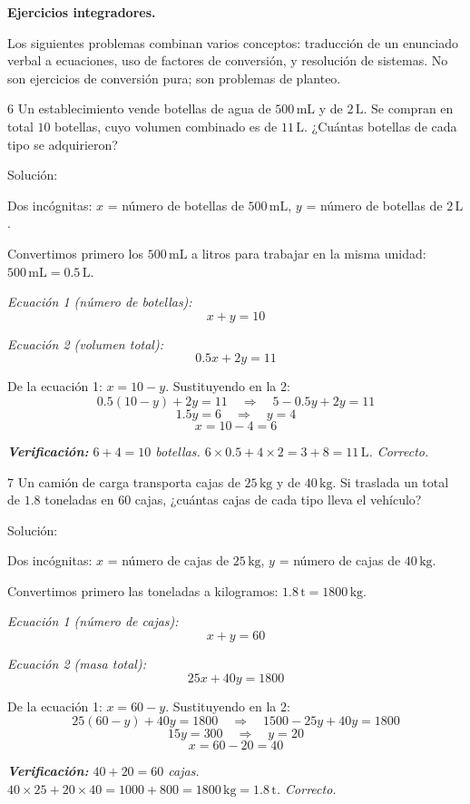 
\textbf{Ejercicios integradores.}

Los siguientes problemas combinan varios conceptos: traducción de un
enunciado verbal a ecuaciones, uso de factores de conversión, y
resolución de sistemas. No son ejercicios de conversión pura; son
problemas de planteo.

\begin{exercise}{6}{}
Un establecimiento vende botellas de agua de $500\,\mathrm{mL}$ y de
$2\,\mathrm{L}$. Se compran en total $10$ botellas, cuyo volumen
combinado es de $11\,\mathrm{L}$. ¿Cuántas botellas de cada tipo se
adquirieron?

Solución:

Dos incógnitas: $x$ = número de botellas de $500\,\mathrm{mL}$,
$y$ = número de botellas de $2\,\mathrm{L}$.

Convertimos primero los $500\,\mathrm{mL}$ a litros para trabajar en
la misma unidad: $500\,\mathrm{mL} = 0.5\,\mathrm{L}$.

\textit{Ecuación 1 (número de botellas):}
\[
x + y = 10
\]

\textit{Ecuación 2 (volumen total):}
\[
0.5x + 2y = 11
\]

De la ecuación 1: $x = 10 - y$. Sustituyendo en la 2:
\[
0.5(10 - y) + 2y = 11 \quad \Rightarrow \quad 5 - 0.5y + 2y = 11
\]
\[
1.5y = 6 \quad \Rightarrow \quad y = 4
\]
\[
x = 10 - 4 = 6
\]

{\small\itshape
\textbf{Verificación:} $6 + 4 = 10$ botellas.
$6 \times 0.5 + 4 \times 2 = 3 + 8 = 11\,\mathrm{L}$. Correcto.
}
\end{exercise}

\begin{exercise}{7}{}
Un camión de carga transporta cajas de $25\,\mathrm{kg}$ y de
$40\,\mathrm{kg}$. Si traslada un total de $1.8$ toneladas en
$60$ cajas, ¿cuántas cajas de cada tipo lleva el vehículo?

Solución:

Dos incógnitas: $x$ = número de cajas de $25\,\mathrm{kg}$,
$y$ = número de cajas de $40\,\mathrm{kg}$.

Convertimos primero las toneladas a kilogramos:
$1.8\,\mathrm{t} = 1800\,\mathrm{kg}$.

\textit{Ecuación 1 (número de cajas):}
\[
x + y = 60
\]

\textit{Ecuación 2 (masa total):}
\[
25x + 40y = 1800
\]

De la ecuación 1: $x = 60 - y$. Sustituyendo en la 2:
\[
25(60 - y) + 40y = 1800 \quad \Rightarrow \quad 1500 - 25y + 40y = 1800
\]
\[
15y = 300 \quad \Rightarrow \quad y = 20
\]
\[
x = 60 - 20 = 40
\]

{\small\itshape
\textbf{Verificación:} $40 + 20 = 60$ cajas.
$40 \times 25 + 20 \times 40 = 1000 + 800 = 1800\,\mathrm{kg} =
1.8\,\mathrm{t}$. Correcto.
}
\end{exercise}

